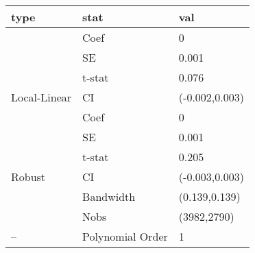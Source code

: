 
\begin{tabular}{lll}
\toprule
type & stat & val\\
\midrule
 & Coef & 0\\

 & SE & 0.001\\

 & t-stat & 0.076\\

\multirow{-4}{*}{\raggedright\arraybackslash Local-Linear} & CI & (-0.002,0.003)\\
\cmidrule{1-3}
 & Coef & 0\\

 & SE & 0.001\\

 & t-stat & 0.205\\

\multirow{-4}{*}{\raggedright\arraybackslash Robust} & CI & (-0.003,0.003)\\
\cmidrule{1-3}
 & Bandwidth & (0.139,0.139)\\

 & Nobs & (3982,2790)\\

\multirow{-3}{*}{\raggedright\arraybackslash --} & Polynomial Order & 1\\
\bottomrule
\end{tabular}